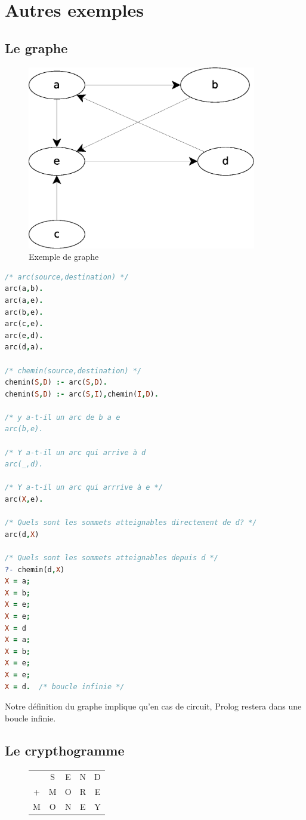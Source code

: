 \documentclass[12pt,a4paper,openany]{book}
\begin{document}
		\section{Autres exemples}
		\subsection{Le graphe}
		\begin{figure}[H]
			\centering
			\includegraphics[width=10cm]{Diagramme1.eps}
			\caption{Exemple de graphe}
		\end{figure}
		\begin{lstlisting}[language=Prolog, framerule=0pt]
/* arc(source,destination) */
arc(a,b).
arc(a,e).
arc(b,e).
arc(c,e).
arc(e,d).
arc(d,a).

/* chemin(source,destination) */
chemin(S,D) :- arc(S,D).
chemin(S,D) :- arc(S,I),chemin(I,D).

/* y a-t-il un arc de b a e
arc(b,e).

/* Y a-t-il un arc qui arrive à d
arc(_,d).

/* Y a-t-il un arc qui arrrive à e */
arc(X,e).

/* Quels sont les sommets atteignables directement de d? */
arc(d,X)

/* Quels sont les sommets atteignables depuis d */
?- chemin(d,X)
X = a;
X = b;
X = e;
X = e;
X = d
X = a;
X = b;
X = e;
X = e;
X = d.  /* boucle infinie */
	\end{lstlisting}
	\begin{attention}
		Notre définition du graphe implique qu'en cas de circuit, Prolog restera dans une boucle infinie.
	\end{attention}

	\subsection{Le crypthogramme}
		\begin{figure}
			\vspace{40px}	
	\begin{tabular}{ccccc}
		&S&E&N&D\\
		+&M&O&R&E\\
		\hline
		M&O&N&E&Y\\
	\end{tabular}
	\end{figure}
\end{document}
